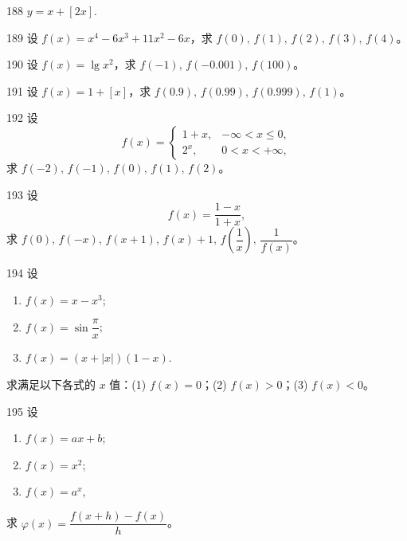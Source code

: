 \begin{prob}[S]{188}
$y = x + [2x]$.
\end{prob}

\begin{prob}[S]{189}
设 $f(x) = x^4 - 6x^3 + 11x^2 - 6x$，求 $f(0),\, f(1),\, f(2),\, f(3),\, f(4)$。
\end{prob}

\begin{prob}[S]{190}
设 $f(x) = \lg x^2$，求 $f(-1),\, f(-0.001),\, f(100)$。
\end{prob}

\begin{prob}[S]{191}
设 $f(x) = 1 + [x]$，求 $f(0.9),\, f(0.99),\, f(0.999),\, f(1)$。
\end{prob}

\begin{prob}[M]{192}
设
\[
f(x) = \begin{cases}
1 + x, & -\infty < x \leqslant 0, \\
2^x, & 0 < x < +\infty,
\end{cases}
\]
求 $f(-2),\, f(-1),\, f(0),\, f(1),\, f(2)$。
\end{prob}

\begin{prob}[M]{193}
设
\[
f(x) = \frac{1 - x}{1 + x},
\]
求 $f(0),\, f(-x),\, f(x + 1),\, f(x) + 1,\, f\!\left(\dfrac{1}{x}\right),\, \dfrac{1}{f(x)}$。
\end{prob}

\begin{prob}[L]{194}
设
\begin{enumerate}[label=(\alph*), itemsep=2pt, topsep=3pt]
\item $f(x) = x - x^3$;
\item $f(x) = \sin\dfrac{\pi}{x}$;
\item $f(x) = (x + |x|)(1 - x)$.
\end{enumerate}
求满足以下各式的 $x$ 值：(1) $f(x) = 0$；(2) $f(x) > 0$；(3) $f(x) < 0$。
\end{prob}

\begin{prob}[L]{195}
设
\begin{enumerate}[label=(\alph*), itemsep=2pt, topsep=3pt]
\item $f(x) = ax + b$;
\item $f(x) = x^2$;
\item $f(x) = a^x$,
\end{enumerate}
求 $\varphi(x) = \dfrac{f(x + h) - f(x)}{h}$。
\end{prob}

